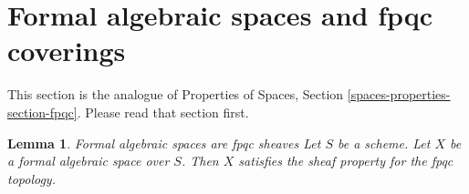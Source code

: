\documentclass{stacks-project}
\newenvironment{slogan}{\comment}{\endcomment}
\theoremstyle{plain}
\newtheorem{lemma}[subsection]{Lemma}
\theoremstyle{definition}
\theoremstyle{remark}
\numberwithin{equation}{subsection}
\begin{document}
\section{Formal algebraic spaces and fpqc coverings}
\label{section-fpqc}

\noindent
This section is the analogue of Properties of Spaces, Section
\ref{spaces-properties-section-fpqc}. Please read that section
first.

\begin{lemma}
\label{lemma-sheaf-fpqc}
\begin{slogan}
Formal algebraic spaces are fpqc sheaves
\end{slogan}
Let $S$ be a scheme. Let $X$ be a formal algebraic space over $S$. Then
$X$ satisfies the sheaf property for the fpqc topology.
\end{lemma}
\end{document}
